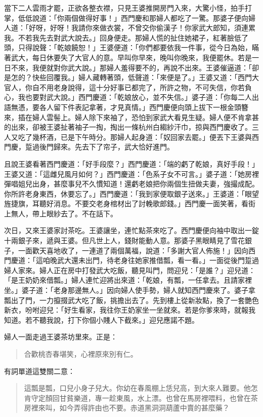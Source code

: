 當下二人雲雨才罷，正欲各整衣襟，只見王婆推開房門入來，大驚小怪，拍手打掌，低低說道：「你兩個做得好事！」西門慶和那婦人都吃了一驚。那婆子便向婦人道：「好呀，好呀！我請你來做衣裳，不曾交你偷漢子！你家武大郎知，須連累我。不若我先去對武大說去。」回身便走。那婦人慌的扯住她裙子，紅著臉低了頭，只得說聲：「乾娘饒恕！」王婆便道：「你們都要依我一件事，從今日為始，瞞著武大，每日休要失了大官人的意。早叫你早來，晚叫你晚來，我便罷休。若是一日不來，我便就對你武大說。」那婦人羞得要不的，再說不出來。王婆催逼道：「卻是怎的？快些回覆我。」婦人藏轉著頭，低聲道：「來便是了。」王婆又道：「西門大官人，你自不用老身說得，這十分好事已都完了，所許之物，不可失信，你若負心，我也要對武大說。」西門慶道：「乾娘放心，並不失信。」婆子道：「你每二人出語無憑，要各人留下件表記拿著，才見真情。」西門慶便向頭上拔下一根金頭簪來，插在婦人雲髻上。婦人除下來袖了，恐怕到家武大看見生疑。婦人便不肯拿甚的出來，卻被王婆扯著袖子一掏，掏出一條杭州白縐紗汗巾，掠與西門慶收了。三人又吃了幾杯酒，已是下午時分。那婦人起身道：「奴回家去罷。」便丟下王婆與西門慶，踅過後門歸來。先去下了帘子，武大恰好進門。

且說王婆看著西門慶道：「好手段麼？」西門慶道：「端的虧了乾娘，真好手段！」王婆又道：「這雌兒風月如何？」西門慶道：「色系子女不可言。」婆子道：「她房裡彈唱姐兒出身，甚麼事兒不久慣知道！還虧老娘把你兩個生扭做夫妻，強撮成配。你所許老身東西，休要忘了。」西門慶道：「我到家便取銀子送來。」王婆道：「眼望旌捷旗，耳聽好消息。不要交老身棺材出了討輓歌郎錢。」西門慶一面笑著，看街上無人，帶上眼紗去了。不在話下。

次日，又來王婆家討茶吃。王婆讓坐，連忙點茶來吃了。西門慶便向袖中取出一錠十兩銀子來，遞與王婆。但凡世上人，錢財能動人意。那婆子黑眼睛見了雪花銀子，一面歡天喜地收了，一連道了兩個萬福，說道：「多謝大官人佈施！」因向西門慶道：「這咱晚武大還未出門，待老身往她家推借瓢，看一看。」一面從後門踅過婦人家來。婦人正在房中打發武大吃飯，聽見叫門，問迎兒：「是誰？」迎兒道：「是王奶奶來借瓢。」婦人連忙迎將出來道：「乾娘，有瓢，一任拿去。且請家裡坐。」婆子道：「老身那邊無人。」因向婦人使手勢，婦人就知西門慶來了。婆子拿瓢出了門，一力攛掇武大吃了飯，挑擔出去了。先到樓上從新妝點，換了一套艷色新衣，吩咐迎兒：「好生看家，我往你王奶家坐一坐就來。若是你爹來時，就報我知道。若不聽我說，打下你個小賤人下截來。」迎兒應諾不題。

婦人一面走過王婆茶坊里來。正是：
\begin{quote}
合歡桃杏春堪笑，心裡原來別有仁。
\end{quote}

有詞單道這雙關二意：
\begin{quote}
這瓢是瓢，口兒小身子兒大。你幼在春風棚上恁兒高，到大來人難要。他怎肯守定顏回甘貧樂道，專一趁東風，水上漂。也曾在馬房裡喂料，也曾在茶房裡來叫，如今弄得許由也不要。赤道黑洞洞葫蘆中賣的甚麼藥？
\end{quote}

